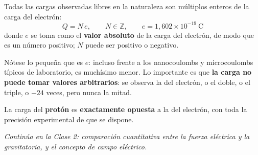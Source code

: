 \documentclass[12pt,a4paper]{article}
\begin{document}
\begin{keybox}
Todas las cargas observadas libres en la naturaleza son múltiplos enteros de la
carga del electrón:
\[
\boxed{\ Q = N\,e, \qquad N \in \mathbb{Z}, \qquad
        e = 1{,}602\times 10^{-19}\ \si{\coulomb}\ }
\]
donde $e$ se toma como el \textbf{valor absoluto} de la carga del electrón, de
modo que es un número positivo; $N$ puede ser positivo o negativo.
\end{keybox}

\begin{notebox}[Lo esencial]
Nótese lo pequeña que es $e$: incluso frente a los nanocoulombs y microcoulombs
típicos de laboratorio, es muchísimo menor. Lo importante es que \textbf{la carga
no puede tomar valores arbitrarios}: se observa la del electrón, o el doble, o el
triple, o $-24$ veces, pero nunca la mitad.
\end{notebox}

La carga del \textbf{protón} es \textbf{exactamente opuesta} a la del electrón,
con toda la precisión experimental de que se dispone.

\vspace{1em}
\noindent\emph{Continúa en la Clase 2: comparación cuantitativa entre la fuerza
eléctrica y la gravitatoria, y el concepto de campo eléctrico.}
\end{document}
